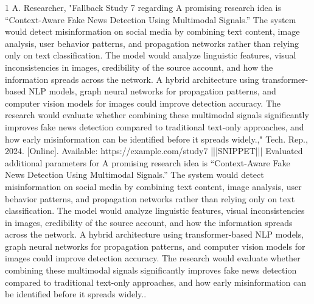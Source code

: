 \documentclass[conference]{IEEEtran}
\begin{document}
\begin{thebibliography}{1}
A. Researcher, "Fallback Study 7 regarding A promising research idea is “Context-Aware Fake News Detection Using Multimodal Signals.” The system would detect misinformation on social media by combining text content, image analysis, user behavior patterns, and propagation networks rather than relying only on text classification. The model would analyze linguistic features, visual inconsistencies in images, credibility of the source account, and how the information spreads across the network. A hybrid architecture using transformer-based NLP models, graph neural networks for propagation patterns, and computer vision models for images could improve detection accuracy. The research would evaluate whether combining these multimodal signals significantly improves fake news detection compared to traditional text-only approaches, and how early misinformation can be identified before it spreads widely.," Tech. Rep., 2024. [Online]. Available: https://example.com/study7 |||SNIPPET||| Evaluated additional parameters for A promising research idea is “Context-Aware Fake News Detection Using Multimodal Signals.” The system would detect misinformation on social media by combining text content, image analysis, user behavior patterns, and propagation networks rather than relying only on text classification. The model would analyze linguistic features, visual inconsistencies in images, credibility of the source account, and how the information spreads across the network. A hybrid architecture using transformer-based NLP models, graph neural networks for propagation patterns, and computer vision models for images could improve detection accuracy. The research would evaluate whether combining these multimodal signals significantly improves fake news detection compared to traditional text-only approaches, and how early misinformation can be identified before it spreads widely..

\end{thebibliography}
\end{document}
